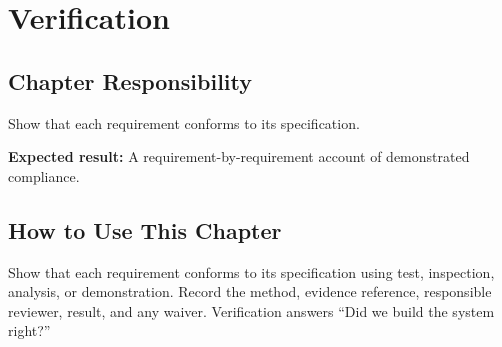\chapter{Verification}
\section{Chapter Responsibility}
\label{Section:VerificationResponsibility}
Show that each requirement conforms to its specification.

\noindent\textbf{Expected result:} A requirement-by-requirement account of demonstrated compliance.

\section{How to Use This Chapter}
Show that each requirement conforms to its specification using test, inspection, analysis, or demonstration. Record the method, evidence reference, responsible reviewer, result, and any waiver.
Verification answers ``Did we build the system right?''

